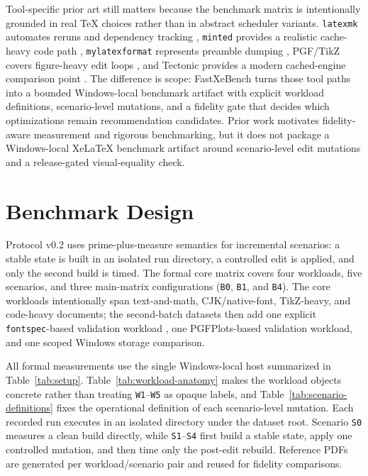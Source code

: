 \documentclass[11pt]{article}
\begin{document}
Tool-specific prior art still matters because the benchmark matrix is intentionally grounded in real TeX choices rather than in abstract scheduler variants. \texttt{latexmk} automates reruns and dependency tracking \cite{ctan-latexmk}, \texttt{minted} provides a realistic cache-heavy code path \cite{ctan-minted}, \texttt{mylatexformat} represents preamble dumping \cite{ctan-mylatexformat}, PGF/TikZ covers figure-heavy edit loops \cite{ctan-pgf}, and Tectonic provides a modern cached-engine comparison point \cite{tectonic-build}. The difference is scope: FastXeBench turns those tool paths into a bounded Windows-local benchmark artifact with explicit workload definitions, scenario-level mutations, and a fidelity gate that decides which optimizations remain recommendation candidates. Prior work motivates fidelity-aware measurement and rigorous benchmarking, but it does not package a Windows-local XeLaTeX benchmark artifact around scenario-level edit mutations and a release-gated visual-equality check.

\section{Benchmark Design}
Protocol v0.2 uses prime-plus-measure semantics for incremental scenarios: a stable state is built in an isolated run directory, a controlled edit is applied, and only the second build is timed. The formal core matrix covers four workloads, five scenarios, and three main-matrix configurations (\texttt{B0}, \texttt{B1}, and \texttt{B4}). The core workloads intentionally span text-and-math, CJK/native-font, TikZ-heavy, and code-heavy documents; the second-batch datasets then add one explicit \texttt{fontspec}-based validation workload \cite{ctan-fontspec}, one PGFPlots-based validation workload, and one scoped Windows storage comparison.





All formal measurements use the single Windows-local host summarized in Table~\ref{tab:setup}. Table~\ref{tab:workload-anatomy} makes the workload objects concrete rather than treating \texttt{W1}--\texttt{W5} as opaque labels, and Table~\ref{tab:scenario-definitions} fixes the operational definition of each scenario-level mutation. Each recorded run executes in an isolated directory under the dataset root. Scenario \texttt{S0} measures a clean build directly, while \texttt{S1}--\texttt{S4} first build a stable state, apply one controlled mutation, and then time only the post-edit rebuild. Reference PDFs are generated per workload/scenario pair and reused for fidelity comparisons.
\end{document}
